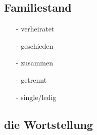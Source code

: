         \subsection{Familiestand}\label{subsection:deutsch:familie:familiestand}

            \begin{itemize}[before=\renewcommand{\baselinestretch}{1},topsep=0pt,itemsep=4pt,parsep=0pt]
                \item[-] verheiratet 
                \item[-] geschieden 
                \item[-] zusammen 
                \item[-] getrennt 
                \item[-] single/ledig 
            \end{itemize}
    
    \subsection{die Wortstellung}\label{subsection:deutsch:wortstellung}

    
